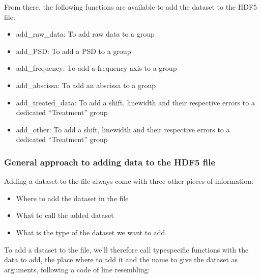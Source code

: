 \documentclass[letterpaper,10pt,english]{sphinxmanual}
\begin{document}
\sphinxAtStartPar
From there, the following functions are available to add the dataset to the HDF5 file:
\begin{itemize}
\item {} 
\sphinxAtStartPar
add\_raw\_data: To add raw data to a group

\item {} 
\sphinxAtStartPar
add\_PSD: To add a PSD to a group

\item {} 
\sphinxAtStartPar
add\_frequency: To add a frequency axis to a group

\item {} 
\sphinxAtStartPar
add\_abscissa: To add an abscissa to a group

\item {} 
\sphinxAtStartPar
add\_treated\_data: To add a shift, linewidth and their respective errors to a dedicated “Treatment” group

\item {} 
\sphinxAtStartPar
add\_other: To add a shift, linewidth and their respective errors to a dedicated “Treatment” group

\end{itemize}


\subsubsection{General approach to adding data to the HDF5 file}
\label{\detokenize{source/hdf5_bls_package:general-approach-to-adding-data-to-the-hdf5-file}}
\sphinxAtStartPar
Adding a dataset to the file always come with three other pieces of information:
\begin{itemize}
\item {} 
\sphinxAtStartPar
Where to add the dataset in the file

\item {} 
\sphinxAtStartPar
What to call the added dataset

\item {} 
\sphinxAtStartPar
What is the type of the dataset we want to add

\end{itemize}

\sphinxAtStartPar
To add a dataset to the file, we’ll therefore call type\sphinxhyphen{}specific functions with the data to add, the place where to add it and the name to give the dataset as arguments, following a code of line resembling:

\begin{sphinxVerbatim}[commandchars=\\\{\}]
  
                   
                   
\end{sphinxVerbatim}
\end{document}
